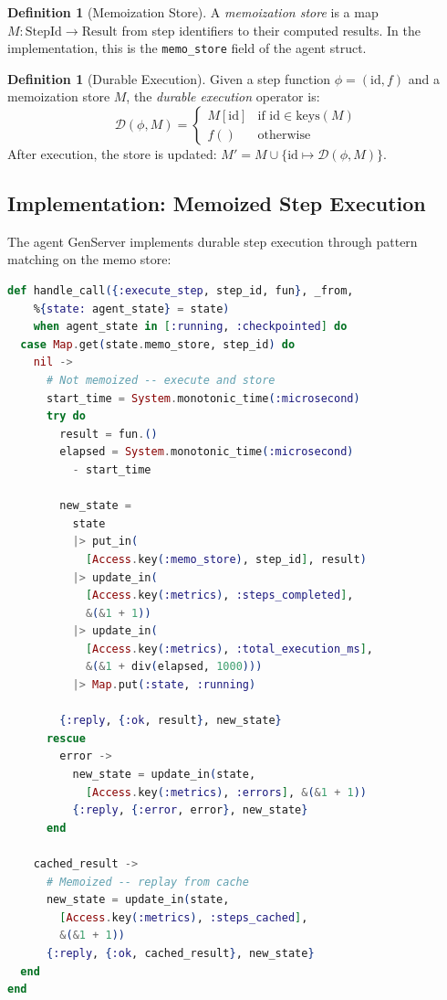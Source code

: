 \documentclass[12pt,a4paper]{article}
\theoremstyle{definition}
\newtheorem{definition}[theorem]{Definition}
\theoremstyle{remark}
\begin{document}
\begin{definition}[Memoization Store]\label{def:memo-store}
A \emph{memoization store} is a map $M: \text{StepId} \to \text{Result}$ from step identifiers to their computed results. In the implementation, this is the \texttt{memo\_store} field of the agent struct.
\end{definition}

\begin{definition}[Durable Execution]\label{def:durable-exec}
Given a step function $\phi = (\text{id}, f)$ and a memoization store $M$, the \emph{durable execution} operator is:
\begin{equation}
  \mathcal{D}(\phi, M) = \begin{cases}
    M[\text{id}] & \text{if } \text{id} \in \text{keys}(M) \\
    f() & \text{otherwise}
  \end{cases}
\end{equation}
After execution, the store is updated: $M' = M \cup \{\text{id} \mapsto \mathcal{D}(\phi, M)\}$.
\end{definition}

\subsection{Implementation: Memoized Step Execution}

The agent GenServer implements durable step execution through pattern matching on the memo store:

\begin{lstlisting}[language=elixir, caption={Durable step execution with memoization (from \texttt{agent.ex})}, label={lst:durable-step}]
def handle_call({:execute_step, step_id, fun}, _from,
    %{state: agent_state} = state)
    when agent_state in [:running, :checkpointed] do
  case Map.get(state.memo_store, step_id) do
    nil ->
      # Not memoized -- execute and store
      start_time = System.monotonic_time(:microsecond)
      try do
        result = fun.()
        elapsed = System.monotonic_time(:microsecond)
          - start_time

        new_state =
          state
          |> put_in(
            [Access.key(:memo_store), step_id], result)
          |> update_in(
            [Access.key(:metrics), :steps_completed],
            &(&1 + 1))
          |> update_in(
            [Access.key(:metrics), :total_execution_ms],
            &(&1 + div(elapsed, 1000)))
          |> Map.put(:state, :running)

        {:reply, {:ok, result}, new_state}
      rescue
        error ->
          new_state = update_in(state,
            [Access.key(:metrics), :errors], &(&1 + 1))
          {:reply, {:error, error}, new_state}
      end

    cached_result ->
      # Memoized -- replay from cache
      new_state = update_in(state,
        [Access.key(:metrics), :steps_cached],
        &(&1 + 1))
      {:reply, {:ok, cached_result}, new_state}
  end
end
\end{lstlisting}
\end{document}
